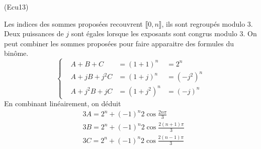 \begin{tiny}(Ecu13)\end{tiny} Les indices des sommes proposées recouvrent $\llbracket 0,n\rrbracket$, ils sont regroupés modulo $3$. Deux puissances de $j$ sont égales lorsque les exposants sont congrus modulo $3$. On peut combiner les sommes proposées pour faire apparaitre des formules du binôme.
\begin{displaymath}
\left\lbrace  
\begin{aligned}
  &A + B + C     &= (1+1)^n  &= 2^n\\
  &A + jB + j^2C &= (1+j)^n  &= (-j^2)^n\\
  &A + j^2B + jC &= (1+j^2)^n &= (-j)^n
\end{aligned}
\right. 
\end{displaymath}
En combinant linéairement, on déduit
\begin{align*}
&3A = 2^n +(-1)^n2\cos\frac{2n\pi}{3} \\
&3B = 2^n +(-1)^n2\cos\frac{2(n+1)\pi}{3} \\
&3C = 2^n +(-1)^n2\cos\frac{2(n-1)\pi}{3}
\end{align*}
